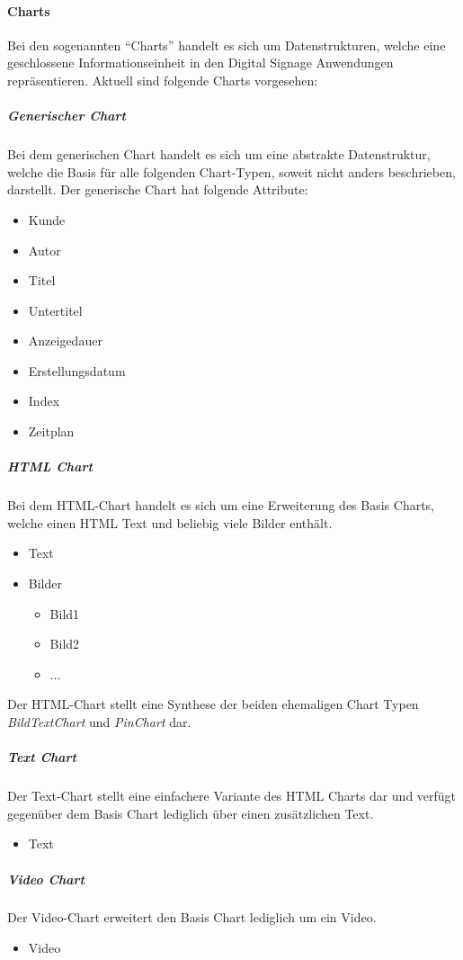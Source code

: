\documentclass[a4paper]{article}
\begin{document}
	\paragraph{Charts}
	Bei den sogenannten \enquote{Charts} handelt es sich um Datenstrukturen, welche eine geschlossene Informationseinheit in den Digital Signage Anwendungen repräsentieren.
	Aktuell sind folgende Charts vorgesehen:
	\subparagraph{Generischer Chart}
	Bei dem generischen Chart handelt es sich um eine abstrakte Datenstruktur, welche die Basis für alle folgenden Chart-Typen, soweit nicht anders beschrieben, darstellt.
	Der generische Chart hat folgende Attribute:
	\begin{itemize}
	\item Kunde
	\item Autor
	\item Titel
	\item Untertitel
	\item Anzeigedauer
	\item Erstellungsdatum
	\item Index
	\item Zeitplan
	\end{itemize}
	\subparagraph{HTML Chart}
	Bei dem HTML-Chart handelt es sich um eine Erweiterung des Basis Charts, welche einen HTML Text und beliebig viele Bilder enthält.
	\begin{itemize}
	\item Text
	\item Bilder
		\begin{itemize}
		\item Bild1
		\item Bild2
		\item ...
		\end{itemize}
	\end{itemize}
	Der HTML-Chart stellt eine Synthese der beiden ehemaligen Chart Typen \emph{BildTextChart} und \emph{PinChart} dar.
	\subparagraph{Text Chart}
	Der Text-Chart stellt eine einfachere Variante des HTML Charts dar und verfügt gegenüber dem Basis Chart lediglich über einen zusätzlichen Text.
	\begin{itemize}
	\item Text
	\end{itemize}
	\subparagraph{Video Chart}
	Der Video-Chart erweitert den Basis Chart lediglich um ein Video.
	\begin{itemize}
	\item Video
	\end{itemize}
\end{document}
